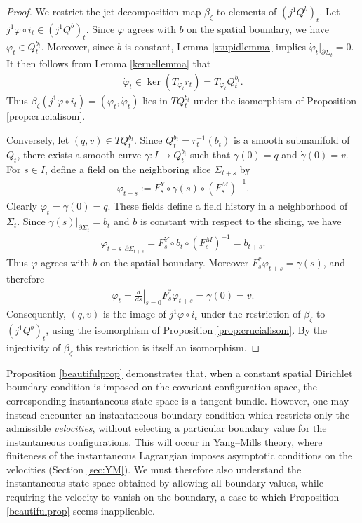 \documentclass{article}
\theoremstyle{definition}
\begin{document}
\begin{proof}
We restrict the jet decomposition map $\beta_\zeta$ to elements of
$(j^1Q^b)_t$. Let $j^1\varphi\circ i_t\in(j^1Q^b)_t$. Since
$\varphi$ agrees with $b$ on the spatial boundary, we have $\varphi_t\in Q_t^{b_t}$.
Moreover, since $b$ is constant, Lemma \ref{stupidlemma} implies $\dot{\varphi}_t|_{\partial\Sigma_t}=0$. It then follows from Lemma \ref{kernellemma} that
\begin{align*}
    \dot{\varphi}_t
    \in
    \ker(T_{\varphi_t}r_t)
    =
    T_{\varphi_t}Q_t^{b_t}.
\end{align*}
Thus $\beta_\zeta(j^1\varphi\circ i_t)
    =(\varphi_t,\dot{\varphi}_t)$ lies in $TQ_t^{b_t}$ under the isomorphism of Proposition \ref{prop:crucialisom}.

Conversely, let $(q,v)\in TQ_t^{b_t}$. Since $Q_t^{b_t}=r_t^{-1}(b_t)$ is a
smooth submanifold of $Q_t$, there exists a smooth curve $\gamma:I\longrightarrow Q_t^{b_t}$ such that $\gamma(0)=q$ and $\dot{\gamma}(0)=v$. For $s\in I$, define a field on the
neighboring slice $\Sigma_{t+s}$ by
\begin{align*}
    \varphi_{t+s}
    :=
    F_s^Y\circ\gamma(s)\circ(F_s^M)^{-1}.
\end{align*}
Clearly $\varphi_t=\gamma(0)=q$. These fields define a field history in a neighborhood of
$\Sigma_t$. Since $\gamma(s)|_{\partial\Sigma_t}=b_t$ and $b$ is
constant with respect to the slicing, we have
\begin{align*}
    \varphi_{t+s}|_{\partial\Sigma_{t+s}}
    =
    F_s^Y\circ b_t\circ(F_s^M)^{-1}
    =
    b_{t+s}.
\end{align*}
Thus $\varphi$ agrees with $b$ on the spatial boundary. Moreover $F_s^*\varphi_{t+s}=\gamma(s)$,
and therefore
\begin{align*}
    \dot{\varphi}_t
    =
    \left.\frac{d}{ds}\right|_{s=0}
    F_s^*\varphi_{t+s}
    =
    \dot{\gamma}(0)
    =
    v.
\end{align*}
Consequently, $(q,v)$ is the image of $j^1\varphi\circ i_t$ under the restriction of
$\beta_\zeta$ to $(j^1Q^b)_t$, using the isomorphism of Proposition
\ref{prop:crucialisom}. By the injectivity of $\beta_\zeta$ this restriction is itself an isomorphism.
\end{proof}

Proposition \ref{beautifulprop} demonstrates that, when a constant spatial Dirichlet boundary condition is imposed on the covariant configuration space, the corresponding instantaneous state space is a tangent bundle. However, one may instead encounter an instantaneous boundary condition which restricts only the admissible \textit{velocities},
without selecting a particular boundary value for the instantaneous configurations.
This will occur in Yang--Mills theory, where finiteness of the
instantaneous Lagrangian imposes asymptotic conditions on the
velocities (Section \ref{sec:YM}). We must therefore also understand the instantaneous state space obtained by allowing all boundary
values, while requiring the velocity to vanish on the boundary, a case to which Proposition \ref{beautifulprop} seems inapplicable.
\end{document}
